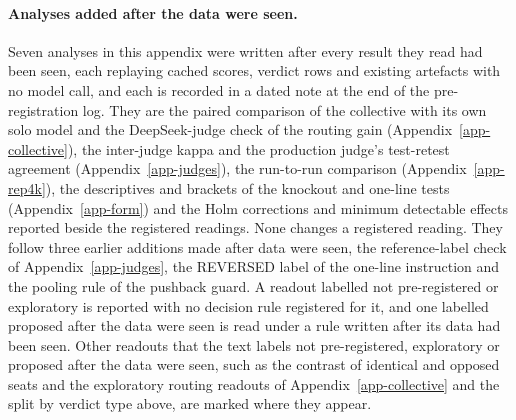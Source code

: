 \paragraph{Analyses added after the data were seen.}
Seven analyses in this appendix were written after every
result they read had been seen, each replaying cached scores, verdict rows
and existing artefacts with no model call, and each is recorded in a dated
note at the end of the pre-registration log. They are the paired comparison
of the collective with its own solo model and the DeepSeek-judge check of
the routing gain (Appendix~\ref{app-collective}), the inter-judge kappa and
the production judge's test-retest agreement (Appendix~\ref{app-judges}),
the run-to-run comparison (Appendix~\ref{app-rep4k}), the descriptives and
brackets of the knockout and one-line tests (Appendix~\ref{app-form}) and
the Holm corrections and minimum detectable effects reported beside the
registered readings. None changes a registered reading. They follow three
earlier additions made after data were seen, the reference-label check of
Appendix~\ref{app-judges}, the REVERSED label of the one-line instruction and
the pooling rule of the pushback guard. A readout labelled not
pre-registered or exploratory is reported with no decision rule registered
for it, and one labelled proposed after the data were seen is read under a
rule written after its data had been seen.
Other readouts that the text labels
not pre-registered, exploratory or proposed after the data were seen, such
as the contrast of identical and opposed seats and the exploratory routing
readouts of Appendix~\ref{app-collective} and the split by verdict type
above, are marked where they appear.

